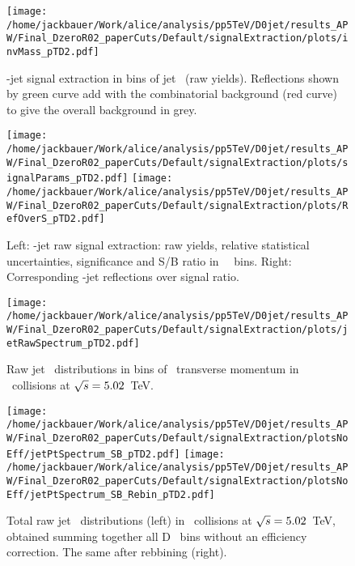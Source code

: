 \begin{figure}[bth]
\centering
\texttt{[image: /home/jackbauer/Work/alice/analysis/pp5TeV/D0jet/results\_APW/Final\_DzeroR02\_paperCuts/Default/signalExtraction/plots/invMass\_pTD2.pdf]}
\caption{\Dzero-jet signal extraction in bins of jet \pt\ (raw yields). %
Reflections shown by green curve add with the combinatorial background (red curve) to give the overall background in grey.
}
\label{fig:eq_pp_InvMass_Dzero_DbinsR02}
\end{figure}
\begin{figure}[bth]
\centering
\texttt{[image: /home/jackbauer/Work/alice/analysis/pp5TeV/D0jet/results\_APW/Final\_DzeroR02\_paperCuts/Default/signalExtraction/plots/signalParams\_pTD2.pdf]}
\texttt{[image: /home/jackbauer/Work/alice/analysis/pp5TeV/D0jet/results\_APW/Final\_DzeroR02\_paperCuts/Default/signalExtraction/plots/RefOverS\_pTD2.pdf]}
\caption{Left: \Dzero-jet raw signal extraction: raw yields, relative statistical uncertainties, significance and S/B ratio in \Dzero\ \pt\ bins.%
Right: Corresponding \Dzero-jet reflections over signal ratio.}
\label{fig:eq_pp_RSU_raw_Dbins_DzeroR02}
\end{figure}
\begin{figure}[bth]
\centering
\texttt{[image: /home/jackbauer/Work/alice/analysis/pp5TeV/D0jet/results\_APW/Final\_DzeroR02\_paperCuts/Default/signalExtraction/plots/jetRawSpectrum\_pTD2.pdf]}
\caption{Raw jet \pt\ distributions in bins of \Dzero\ transverse momentum in \pp\ collisions at $\sqrt{s}=5.02$~TeV.}
\label{fig:eq_pp_signBkgJet_Dzero_DbinsR02}
\end{figure}

\begin{figure}[bth]
\centering
	\texttt{[image: /home/jackbauer/Work/alice/analysis/pp5TeV/D0jet/results\_APW/Final\_DzeroR02\_paperCuts/Default/signalExtraction/plotsNoEff/jetPtSpectrum\_SB\_pTD2.pdf]}
	\texttt{[image: /home/jackbauer/Work/alice/analysis/pp5TeV/D0jet/results\_APW/Final\_DzeroR02\_paperCuts/Default/signalExtraction/plotsNoEff/jetPtSpectrum\_SB\_Rebin\_pTD2.pdf]}
\caption{Total raw jet \pt\ distributions (left) in \pp\ collisions at $\sqrt{s}=5.02$~TeV, obtained summing together all D \pt\ bins without an efficiency correction. The same after rebbining (right).}
\label{fig:eq_pp_signBkgJet_totR02}
\end{figure}


